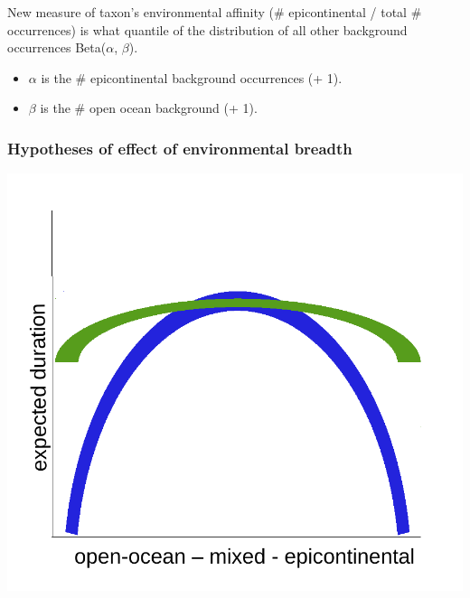 \documentclass{beamer}
\begin{document}
\begin{frame}
  \begin{block}{New measure of taxon's environmental affinity}
    (\# epicontinental / total \# occurrences) is what quantile of the distribution of all other background occurrences Beta(\(\alpha\), \(\beta\)).
    \begin{itemize}
      \item \(\alpha\) is the \# epicontinental background occurrences (+ 1).
      \item \(\beta\) is the \# open ocean background (+ 1).
    \end{itemize}
  \end{block}
\end{frame}

\begin{frame}
  \frametitle{Hypotheses of effect of environmental breadth}
  \begin{center}
    \includegraphics[width = \textwidth,height = 0.8\textheight,keepaspectratio = true]{figure/selection_breadth}
  \end{center}
\end{frame}
\end{document}
